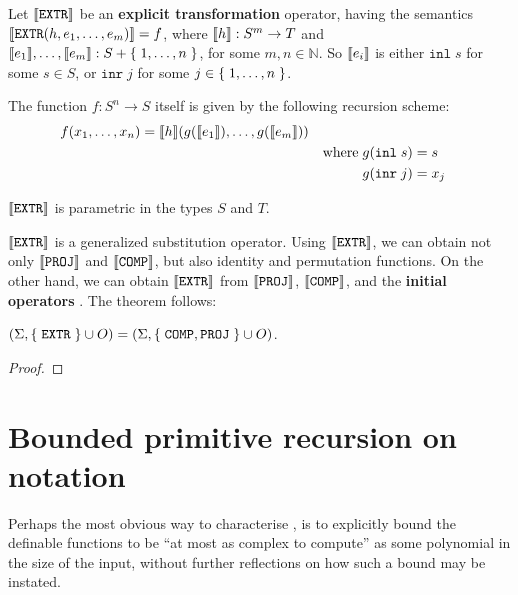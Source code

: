 \begin{definition} \cite[p. 21]{smullyan-1961} Let $\sem{\mathtt{EXTR}}$ be an
\textbf{explicit transformation} operator, having the semantics
$\sem{\mathtt{EXTR}\p{h,e_1,\ldots,e_m}} = f$, where $\sem{h} : S^m \rightarrow
T$ and $\sem{e_1}, \ldots, \sem{e_m} : S + \set{1,\ldots,n}$, for some $m,n \in
\mathbb{N}$. So $\sem{e_i}$ is either $\mathtt{inl} \; s$ for some $s \in S$,
or $\mathtt{inr} \; j$ for some $j \in \set{1,\ldots, n}$.

The function $f : S^n \rightarrow S$ itself is given by the following recursion
scheme:\begin{alignat*}{3}
%
f\p{x_1,\ldots,x_n} &= \sem{h}\p{g\p{\sem{e_1}},\ldots,g\p{\sem{e_m}}} \\
%
& & \text{where} \; g\p{\mathtt{inl} \; s} &= s \\
%
& & g\p{\mathtt{inr} \; j} &= x_j
%
\end{alignat*}

\end{definition}

\begin{remark} $\sem{\mathtt{EXTR}}$ is parametric in the types $S$ and $T$.
\end{remark}

$\sem{\mathtt{EXTR}}$ is a generalized substitution operator. Using
$\sem{\mathtt{EXTR}}$, we can obtain not only $\sem{\mathtt{PROJ}}$ and
$\sem{\mathtt{COMP}}$, but also identity and permutation functions.  On the
other hand, we can obtain $\sem{\mathtt{EXTR}}$ from $\sem{\mathtt{PROJ}}$,
$\sem{\mathtt{COMP}}$, and the {\bfseries \color{red} initial operators}
\cite{rose-1984}. The theorem follows:

\begin{theorem}\label{thm:extr-comp-proj} $\p{\Sigma,\set{\mathtt{EXTR}} \cup
O} = \p{\Sigma,\set{\mathtt{COMP}, \mathtt{PROJ}} \cup O}$. \end{theorem}

\begin{proof}  \end{proof}

\section{Bounded primitive recursion on notation}

Perhaps the most obvious way to characterise \FPTIME{}, is to explicitly bound
the definable functions to be ``at most as complex to compute'' as some
polynomial in the size of the input, without further reflections on how such a
bound may be instated.

